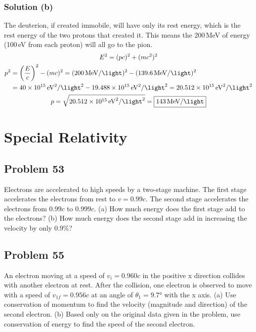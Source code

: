 \documentclass[12pt]{report}
\newcommand{\E}[1]{\times 10^{#1}}
\begin{document}
    \subsection*{Solution (b)}
        The deuterion, if created immobile, will have only its rest energy, which is the rest energy of the two protons that created it.
        This means the 200\,\unit{\mega\eV} of energy (100\,\unit{\eV} from each proton) will all go to the pion.
        \begin{gather*}
            E^2 =   (pc)^2 + (mc^2)^2\\
            \begin{align*}    
                p^2 &=  \left( \frac{E}{c} \right)^2 - (mc)^2
                    =   (200\,\unit{\mega\eV/\light})^2 - (139.6\,\unit{\mega\eV/\light})^2\\
                    &=  40\E{15}\,\unit{\eV^2/\light^2} - 19.488\E{15}\,\unit{\eV^2/\light^2}
                    =   20.512\E{15}\,\unit{\eV^2/\light^2}
            \end{align*}\\
            p   =   \sqrt{20.512\E{15}\,\unit{\eV^2/\light^2}}
                =   \boxed{143\,\unit{\mega\eV/\light}}
        \end{gather*}

\setcounter{chapter}{1}

\chapter{Special Relativity}

\pagebreak
\section{Problem 53}
    Electrons are accelerated to high speeds by a two-stage machine. 
    The ﬁrst stage accelerates the electrons from rest to $v = 0.99c$. 
    The second stage accelerates the electrons from $0.99c$ to $0.999c$. 
    (a) How much energy does the first stage add to the electrons? 
    (b) How much energy does the second stage add in increasing the velocity by only 0.9\%?

\pagebreak
\section{Problem 55}
    An electron moving at a speed of $v_i = 0.960c$ in the positive x direction collides with another electron at rest. 
    After the collision, one electron is observed to move with a speed of $v_{1f} = 0.956c$ at an angle of $\theta_1 = 9.7\unit{\degree}$ with the x axis. 
    (a) Use conservation of momentum to ﬁnd the velocity (magnitude and direction) of the second electron. 
    (b) Based only on the original data given in the problem, use conservation of energy to ﬁnd the speed of the second electron.
\end{document}
